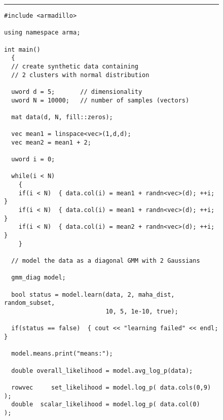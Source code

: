 
\begin{figure}[!h]
\vspace{1ex}
\hrule
\vspace{1ex}
\centering
\begin{adjustbox}{minipage=\columnwidth,scale={1}{1.2}}
\begin{Verbatim}[fontsize=\footnotesize]
#include <armadillo>

using namespace arma;

int main()
  {
  // create synthetic data containing
  // 2 clusters with normal distribution
  
  uword d = 5;       // dimensionality
  uword N = 10000;   // number of samples (vectors)
  
  mat data(d, N, fill::zeros);
  
  vec mean1 = linspace<vec>(1,d,d);
  vec mean2 = mean1 + 2;
  
  uword i = 0;
  
  while(i < N)
    {
    if(i < N)  { data.col(i) = mean1 + randn<vec>(d); ++i; }
    if(i < N)  { data.col(i) = mean1 + randn<vec>(d); ++i; }
    if(i < N)  { data.col(i) = mean2 + randn<vec>(d); ++i; }
    }
  
  // model the data as a diagonal GMM with 2 Gaussians
  
  gmm_diag model;
  
  bool status = model.learn(data, 2, maha_dist, random_subset,
                            10, 5, 1e-10, true);
  
  if(status == false)  { cout << "learning failed" << endl; }
  
  model.means.print("means:");
  
  double overall_likelihood = model.avg_log_p(data);
  
  rowvec     set_likelihood = model.log_p( data.cols(0,9) );
  double  scalar_likelihood = model.log_p( data.col(0)    );
  

\end{Verbatim}
\end{adjustbox}
\end{figure}
